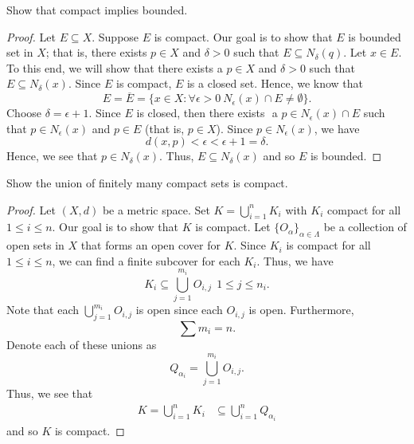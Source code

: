 \documentclass[a4paper]{article}
\begin{document}
   \begin{problem}
       Show that compact implies bounded.
   \end{problem}
   \begin{proof}
    Let \( E \subseteq X  \). Suppose \( E  \) is compact. Our goal is to show that \( E  \) is bounded set in \( X  \); that is, there exists \( p \in X  \) and \( \delta > 0  \) such that \( E \subseteq {N}_{\delta}(q) \). Let \( x \in E  \). To this end, we will show that there exists a \( p \in X  \) and \( \delta > 0  \) such that \( E \subseteq  {N}_{\delta}(x) \). Since \( E  \) is compact, \( E  \) is a closed set. Hence, we know that 
    \[  E = \overline{E}  =  \{ x \in X : \forall \epsilon > 0 \ {N}_{\epsilon}(x) \cap E \neq \emptyset \}.  \]
    Choose \( \delta = \epsilon + 1  \). Since \( E  \) is closed, then there exists \(  \) a \(p \in {N}_{\epsilon}(x) \cap E  \) such that \( p \in {N}_{\epsilon}(x) \) and \( p \in E  \) (that is, \( p \in X  \)). Since \( p \in {N}_{\epsilon}(x) \), we have
    \[  d(x,p) < \epsilon < \epsilon + 1 = \delta. \]
    Hence, we see that \( p \in {N}_{\delta}(x) \). Thus, \( E \subseteq  {N}_{\delta}(x) \) and so \( E  \) is bounded.
   \end{proof}

   \begin{problem}
      Show the union of finitely many compact sets is compact. 
   \end{problem}
   \begin{proof}
       Let \( (X,d)  \) be a metric space. Set \( K =  \bigcup_{ i=1 }^{ n } {K}_{i} \) with \( {K}_{i} \) compact for all \( 1 \leq i \leq n  \). Our goal is to show that \( K  \) is compact. Let \( \{ {O}_{\alpha} \}_{\alpha \in \Lambda} \) be a collection of open sets in \( X  \) that forms an open cover for \( K  \). Since \( {K}_{i} \) is compact for all \( 1 \leq i \leq n  \), we can find a finite subcover for each \( {K}_{i} \). Thus, we have  
       \[  {K}_{i} \subseteq \bigcup_{ j=1  }^{ {m}_{i} } {O}_{i,j} \ \ 1 \leq j \leq {n}_{i}.  \]
       Note that each \( \bigcup_{ j=1 }^{ {m}_{i} } {O}_{i,j} \) is open since each \( {O}_{i,j} \) is open. Furthermore, 
       \[  \sum {m}_{i} = n.  \]
       Denote each of these unions as 
       \[  {Q}_{\alpha_i} = \bigcup_{ j=1  }^{ {m}_{i} }  {O}_{i,j}. \]
       Thus, we see that 
       \begin{align*}
           K = \bigcup_{ i=1  }^{ n }  {K}_{i} &\subseteq \bigcup_{ i=1  }^{ n } {Q}_{{\alpha}_{i}}
       \end{align*}
       and so \( K  \) is compact.
   \end{proof}
\end{document}
